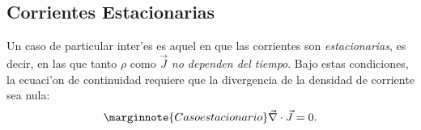 \subsection{Corrientes Estacionarias}

Un caso de particular inter'es es aquel en que las corrientes son
\textit{estacionarias}, es decir, en las que tanto $\rho$ como $\vec{J}$ \textit{no dependen del tiempo}. Bajo estas condiciones, la ecuaci'on de continuidad requiere que la
divergencia de la densidad de corriente sea nula:
\begin{equation}\marginnote{Caso estacionario}
 \vec{\nabla}\cdot\vec{J}=0. \label{divJ0}
\end{equation}


%

